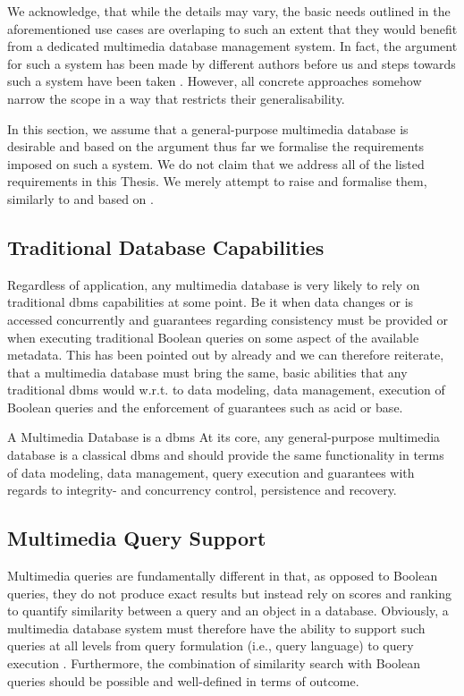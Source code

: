 We acknowledge, that while the details may vary, the basic needs outlined in the aforementioned use cases are overlaping to such an extent that they would benefit from a dedicated multimedia database management system. In fact, the argument for such a system has been made by different authors before us \cite{Adjeroh:1997Multimedia,Smeulders:2000Content,Zahalka:2014towards,Jonson:2016,Khaleel:2021An} and steps towards such a system have been taken \cite{Giangreco:2018Database,Wang:2021Milvus}. However, all concrete approaches somehow narrow the scope in a way that restricts their generalisability.

In this section, we assume that a general-purpose multimedia database is desirable and based on the argument thus far we formalise the requirements imposed on such a system. We do not claim that we address all of the listed requirements in this Thesis. We merely attempt to raise and formalise them, similarly to and based on \cite{Adjeroh:1997Multimedia,Jonson:2016,Khaleel:2021An}.

\subsection{Traditional Database Capabilities}
Regardless of application, any multimedia database is very likely to rely on traditional \acrshort{dbms} capabilities at some point. Be it when data changes or is accessed concurrently and guarantees regarding consistency must be provided or when executing traditional Boolean queries on some aspect of the available metadata. This has been pointed out by \cite{Adjeroh:1997Multimedia,Khaleel:2021An} already and we can therefore reiterate, that a multimedia database must bring the same, basic abilities that any traditional \acrshort{dbms} would w.r.t. to data modeling, data management, execution of Boolean queries and the enforcement of guarantees such as \acrshort{acid} or \acrshort{base}.

\begin{requirement}[label=requirement:classical_dbms]{A Multimedia Database is a \acrshort{dbms}}{}
    At its core, any general-purpose multimedia database is a classical \acrlong{dbms} and should provide the same functionality in terms of data modeling, data management, query execution and guarantees with regards to integrity- and concurrency control, persistence and recovery.
\end{requirement}

\subsection{Multimedia Query Support}
Multimedia queries are fundamentally different in that, as opposed to Boolean queries, they do not produce exact results but instead rely on scores and ranking to quantify similarity between a query and an object in a database. Obviously, a multimedia database system must therefore have the ability to support such queries at all levels from query formulation (i.e., query language) to query execution \cite{Adjeroh:1997Multimedia}. Furthermore, the combination of similarity search with Boolean queries should be possible and well-defined in terms of outcome.

